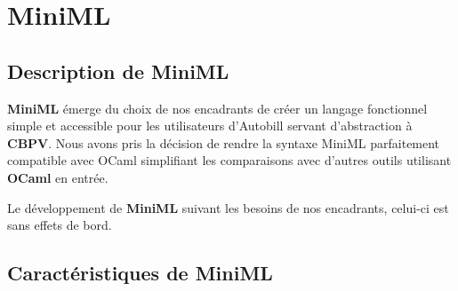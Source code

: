 \documentclass[12pt]{article}
\begin{document}
\newpage
\hypertarget{miniml}{%
      \section{MiniML}\label{miniml}}

\hypertarget{description-de-miniml}{%
      \subsection{Description de MiniML}\label{description-de-miniml}}

\textbf{MiniML} émerge du choix de nos encadrants de créer un langage
fonctionnel simple et accessible pour les utilisateurs d'Autobill
servant d'abstraction à \textbf{CBPV}. Nous avons pris la décision de rendre la syntaxe MiniML parfaitement
compatible avec OCaml simplifiant les comparaisons avec d'autres outils utilisant \textbf{OCaml} en entrée.

Le développement de \textbf{MiniML} suivant les besoins de nos
encadrants, celui-ci est sans effets de bord.

\hypertarget{Caractéristiques-de-miniml}{%
      \subsection{Caractéristiques de MiniML}\label{Caractéristiques-de-miniml}}
\end{document}
